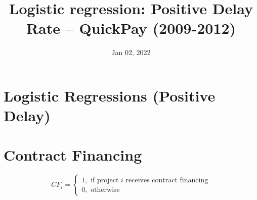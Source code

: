 \documentclass[
]{article}
\title{Logistic regression: Positive Delay Rate -- QuickPay (2009-2012)}
\author{}
\date{\vspace{-2.5em}Jan 02, 2022}
\begin{document}
\maketitle

\hypertarget{logistic-regressions-positive-delay}{%
\section{Logistic Regressions (Positive
Delay)}\label{logistic-regressions-positive-delay}}

\hypertarget{contract-financing}{%
\section{Contract Financing}\label{contract-financing}}

\[ CF_i = \begin{cases} 1, \text{ if project } i \text{ receives contract financing}\\
0, \text{ otherwise} \end{cases}\]
\end{document}
